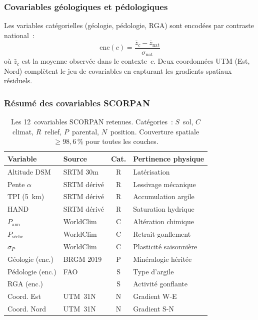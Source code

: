 \documentclass[10pt,a4paper,twocolumn]{article}
\begin{document}
	\subsubsection{Covariables géologiques et pédologiques}
	
	Les variables catégorielles (géologie, pédologie, RGA) sont encodées
	par contraste national~:
	\begin{equation}
		\mathrm{enc}(c)=\frac{\bar{z}_c-\bar{z}_{\mathrm{nat}}}{\sigma_{\mathrm{nat}}}
		\label{eq:encoding}
	\end{equation}
	où $\bar{z}_c$ est la moyenne observée dans le contexte~$c$.
	Deux coordonnées UTM (Est, Nord) complètent le jeu de covariables
	en capturant les gradients spatiaux résiduels.
	
	\subsubsection{Résumé des covariables SCORPAN}
	
	\begin{table}[htbp]
		\centering\small
		\caption{Les 12~covariables SCORPAN retenues.
			Catégories~: $S$~sol, $C$~climat, $R$~relief, $P$~parental,
			$N$~position.
			Couverture spatiale~$\geq98{,}6$\,\% pour toutes les couches.}
		\label{tab:covariables}
		\setlength{\tabcolsep}{3pt}
		\begin{tabular}{@{}p{2.0cm}p{1.6cm}cp{2.1cm}@{}}
			\toprule
			Variable & Source & Cat. & Pertinence physique \\
			\midrule
			Altitude DSM         & SRTM 30m    & R & Latérisation \\
			Pente $\alpha$       & SRTM dérivé & R & Lessivage mécanique \\
			TPI (5~km)           & SRTM dérivé & R & Accumulation argile \\
			HAND                 & SRTM dérivé & R & Saturation hydrique \\
			$P_{\mathrm{ann}}$   & WorldClim   & C & Altération chimique \\
			$P_{\mathrm{sèche}}$ & WorldClim   & C & Retrait-gonflement \\
			$\sigma_P$           & WorldClim   & C & Plasticité saisonnière \\
			Géologie (enc.)      & BRGM 2019   & P & Minéralogie héritée \\
			Pédologie (enc.)     & FAO         & S & Type d'argile \\
			RGA (enc.)           & \cite{chassagneux1996} & S & Activité gonflante \\
			Coord. Est           & UTM~31N     & N & Gradient W-E \\
			Coord. Nord          & UTM~31N     & N & Gradient S-N \\
			\bottomrule
		\end{tabular}
	\end{table}
	
\end{document}
